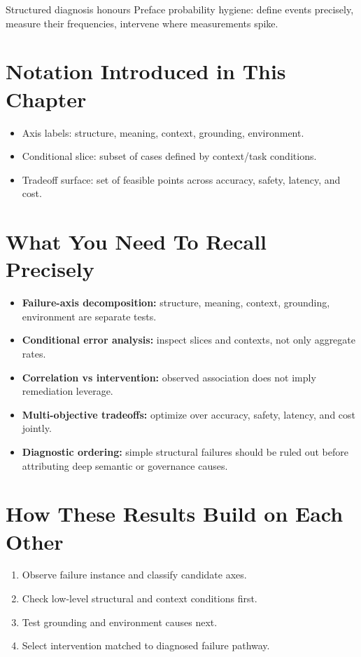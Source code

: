 Structured diagnosis honours Preface probability hygiene: define events precisely, measure their frequencies, intervene where measurements spike.

\section*{Notation Introduced in This Chapter}
\begin{itemize}[leftmargin=1.5em]
  \item Axis labels: structure, meaning, context, grounding, environment.
  \item Conditional slice: subset of cases defined by context/task conditions.
  \item Tradeoff surface: set of feasible points across accuracy, safety, latency, and cost.
\end{itemize}

\section*{What You Need To Recall Precisely}
\begin{itemize}[leftmargin=1.5em]
  \item \textbf{Failure-axis decomposition:} structure, meaning, context, grounding, environment are separate tests.
  \item \textbf{Conditional error analysis:} inspect slices and contexts, not only aggregate rates.
  \item \textbf{Correlation vs intervention:} observed association does not imply remediation leverage.
  \item \textbf{Multi-objective tradeoffs:} optimize over accuracy, safety, latency, and cost jointly.
  \item \textbf{Diagnostic ordering:} simple structural failures should be ruled out before attributing deep semantic or governance causes.
\end{itemize}

\section*{How These Results Build on Each Other}
\begin{enumerate}[leftmargin=1.5em]
  \item Observe failure instance and classify candidate axes.
  \item Check low-level structural and context conditions first.
  \item Test grounding and environment causes next.
  \item Select intervention matched to diagnosed failure pathway.
\end{enumerate}

